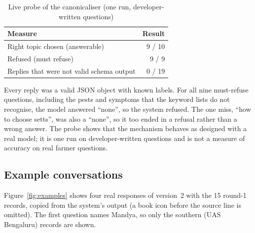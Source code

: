 \begin{table}[h]
\centering
\caption{Live probe of the canonicaliser (one run, developer-written questions)}
\label{tab:canon}
\begin{tabular}{lr}
\toprule
Measure & Result\\
\midrule
Right topic chosen (answerable) & 9 / 10\\
Refused (must refuse) & 9 / 9\\
Replies that were not valid schema output & 0 / 19\\
\bottomrule
\end{tabular}
\end{table}

Every reply was a valid JSON object with known labels. For all nine must-refuse questions,
including the pests and symptoms that the keyword lists do not recognise, the model answered
``none'', so the system refused. The one miss, ``how to choose setts'', was also a ``none'',
so it too ended in a refusal rather than a wrong answer. The probe shows that the mechanism
behaves as designed with a real model; it is one run on developer-written questions and is
not a measure of accuracy on real farmer questions.

\subsection{Example conversations}
Figure~\ref{fig:examples} shows four real responses of version~2 with the 15 round-1
records, copied from the system's output (a book icon before the source line is omitted).
The first question names Mandya, so only the southern (UAS Bengaluru) records are shown.

